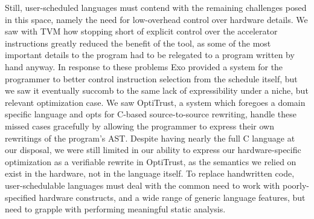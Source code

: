 \documentclass[acmsmall, nonacm=true]{acmart}
\begin{document}
Still, user-scheduled languages must contend with the remaining challenges posed in this space, namely the need for low-overhead control over hardware details. We saw with TVM how stopping short of explicit control over the accelerator instructions greatly reduced the benefit of the tool, as some of the most important details to the program had to be relegated to a program written by hand anyway. In response to these problems Exo provided a system for the programmer to better control instruction selection from the schedule itself, but we saw it eventually succomb to the same lack of expressibility under a niche, but relevant optimization case. We saw OptiTrust, a system which foregoes a domain specific language and opts for C-based source-to-source rewriting, handle these missed cases gracefully by allowing the programmer to express their own rewritings of the program's AST. Despite having nearly the full C language at our disposal, we were still limited in our ability to express our hardware-specific optimization as a verifiable rewrite in OptiTrust, as the semantics we relied on exist in the hardware, not in the language itself. To replace handwritten code, user-schedulable languages must deal with the common need to work with poorly-specified hardware constructs, and a wide range of generic language features, but need to grapple with performing meaningful static analysis.





\clearpage




\clearpage
\end{document}
